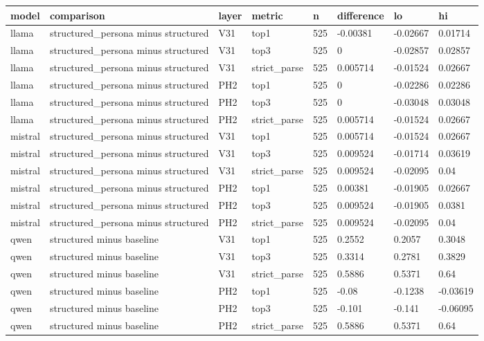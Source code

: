 \begin{tabular}{llllllll}
\toprule
model & comparison & layer & metric & n & difference & lo & hi \\
\midrule
llama & structured\_persona minus structured & V31 & top1 & 525 & -0.00381 & -0.02667 & 0.01714 \\
llama & structured\_persona minus structured & V31 & top3 & 525 & 0 & -0.02857 & 0.02857 \\
llama & structured\_persona minus structured & V31 & strict\_parse & 525 & 0.005714 & -0.01524 & 0.02667 \\
llama & structured\_persona minus structured & PH2 & top1 & 525 & 0 & -0.02286 & 0.02286 \\
llama & structured\_persona minus structured & PH2 & top3 & 525 & 0 & -0.03048 & 0.03048 \\
llama & structured\_persona minus structured & PH2 & strict\_parse & 525 & 0.005714 & -0.01524 & 0.02667 \\
mistral & structured\_persona minus structured & V31 & top1 & 525 & 0.005714 & -0.01524 & 0.02667 \\
mistral & structured\_persona minus structured & V31 & top3 & 525 & 0.009524 & -0.01714 & 0.03619 \\
mistral & structured\_persona minus structured & V31 & strict\_parse & 525 & 0.009524 & -0.02095 & 0.04 \\
mistral & structured\_persona minus structured & PH2 & top1 & 525 & 0.00381 & -0.01905 & 0.02667 \\
mistral & structured\_persona minus structured & PH2 & top3 & 525 & 0.009524 & -0.01905 & 0.0381 \\
mistral & structured\_persona minus structured & PH2 & strict\_parse & 525 & 0.009524 & -0.02095 & 0.04 \\
qwen & structured minus baseline & V31 & top1 & 525 & 0.2552 & 0.2057 & 0.3048 \\
qwen & structured minus baseline & V31 & top3 & 525 & 0.3314 & 0.2781 & 0.3829 \\
qwen & structured minus baseline & V31 & strict\_parse & 525 & 0.5886 & 0.5371 & 0.64 \\
qwen & structured minus baseline & PH2 & top1 & 525 & -0.08 & -0.1238 & -0.03619 \\
qwen & structured minus baseline & PH2 & top3 & 525 & -0.101 & -0.141 & -0.06095 \\
qwen & structured minus baseline & PH2 & strict\_parse & 525 & 0.5886 & 0.5371 & 0.64 \\

\end{tabular}

